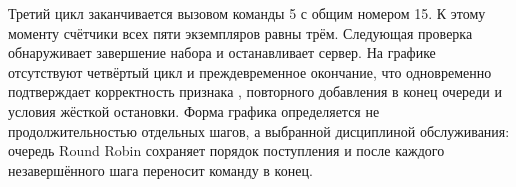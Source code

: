 Третий цикл заканчивается вызовом команды 5 с общим номером 15. К этому моменту счётчики всех пяти экземпляров равны трём. Следующая проверка  обнаруживает завершение набора и останавливает сервер. На графике отсутствуют четвёртый цикл и преждевременное окончание, что одновременно подтверждает корректность признака , повторного добавления в конец очереди и условия жёсткой остановки. Форма графика определяется не продолжительностью отдельных шагов, а выбранной дисциплиной обслуживания: очередь Round Robin сохраняет порядок поступления и после каждого незавершённого шага переносит команду в конец.
